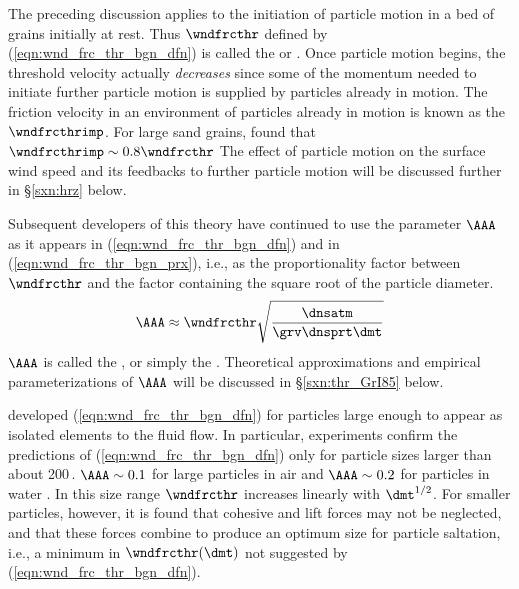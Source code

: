 \documentclass[12pt,twoside]{book}
\begin{document}
The preceding discussion applies to the initiation of particle
motion in a bed of grains initially at rest.
Thus $\wndfrcthr$ defined by (\ref{eqn:wnd_frc_thr_bgn_dfn}) is called
the  or .  
Once particle motion begins, the threshold velocity actually
\textit{decreases} since some of the momentum needed to initiate
further particle motion is supplied by particles already in motion. 
The friction velocity in an environment of particles already in motion
is known as the 
$\wndfrcthrimp$.
For large sand grains, \cite{Bag41} found that 
$\wndfrcthrimp \sim 0.8 \wndfrcthr$
The effect of particle motion on the surface wind speed and its
feedbacks to further particle motion will be discussed further in
\S\ref{sxn:hrz} below. 

Subsequent developers of this theory have continued to use the
parameter $\AAA$ as it appears in (\ref{eqn:wnd_frc_thr_bgn_dfn}) and 
in (\ref{eqn:wnd_frc_thr_bgn_prx}), i.e., as the proportionality
factor between $\wndfrcthr$ and the factor containing the square root
of the particle diameter. 
\begin{equation}
\AAA \approx \wndfrcthr \sqrt{ \frac{\dnsatm}{\grv \dnsprt \dmt}}
\label{eqn:AAA_dfn}
\end{equation}
$\AAA$ is called the ,
or simply the  \cite[]{IvW82}.
Theoretical approximations and empirical parameterizations of $\AAA$
will be discussed in \S\ref{sxn:thr_GrI85} below.

\cite{Bag41} developed (\ref{eqn:wnd_frc_thr_bgn_dfn}) for particles large
enough to appear as isolated elements to the fluid flow. 
In particular, experiments confirm the predictions of
(\ref{eqn:wnd_frc_thr_bgn_dfn}) only for particle sizes larger than about
200\,\um. 
$\AAA \sim 0.1$ for large particles in air and $\AAA \sim 0.2$ for
particles in water \cite[][p. 88]{Bag41}. 
In this size range $\wndfrcthr$ increases linearly with $\dmt^{1/2}$.
For smaller particles, however, it is found that cohesive and lift
forces may not be neglected, and that these forces combine to produce
an optimum size for particle saltation, i.e., a minimum in
$\wndfrcthr(\dmt)$ not suggested by (\ref{eqn:wnd_frc_thr_bgn_dfn}).
\end{document}
